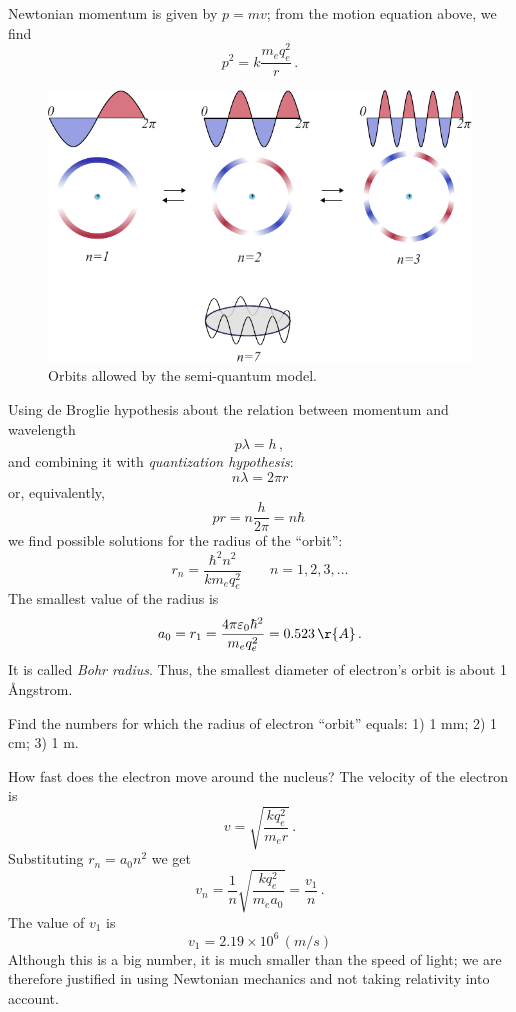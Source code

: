 Newtonian momentum is given by $p=mv$; from the motion equation
above, we find
\[
p^2 = k\frac{m_e q_e^2}{r}\,.
\]

\begin{figure}[htbp]
	\centering
	\includegraphics[scale=1.0]{hydrogenAtomOrbits}
	\caption{Orbits allowed by the semi-quantum model.}
	\label{fig:hydrogenAtomOrbits}
\end{figure}

Using de Broglie hypothesis about the relation between momentum and
wavelength
\[
p\lambda = h\,,
\]
and combining it with \emph{quantization hypothesis}:
\[
n\lambda = 2\pi r
\]
or, equivalently,
\[
pr = n\frac{h}{2\pi} = n\hbar\,
\]
we find possible solutions for the radius of the ``orbit'':
\[
r_n = \frac{\hbar^2 n^2}{km_e q_e^2}\qquad n = 1, 2, 3,\ldots
\]
The smallest value of the radius is
\[
a_0 = r_1 = \frac{4\pi\varepsilon_0 \hbar^2}{m_e q_e^2} = 0.523\,\r{A}\,.
\]
It is called \emph{Bohr radius}. Thus, the smallest diameter of
electron's orbit is about 1 \r{A}ngstrom.
\begin{exercise}
	Find the numbers for which the radius of electron ``orbit'' equals:
	1) 1 mm; 2) 1 cm; 3) 1 m.
\end{exercise}

How fast does the electron move around the nucleus? The velocity
of the electron is
\[
v = \sqrt{\frac{kq_e^2}{m_e r}}\,.
\]
Substituting $r_n = a_0 n^2$ we get
\[
v_n = \frac{1}{n}\sqrt{\frac{kq_e^2}{m_e a_0}} = \frac{v_1}{n}\,.
\]
The value of $v_1$ is
\[
v_1 = 2.19\times 10^6\,(m/s)
\]
Although this is a big number, it is much smaller than the speed of
light; we are therefore justified in using Newtonian mechanics and not
taking relativity into account.

